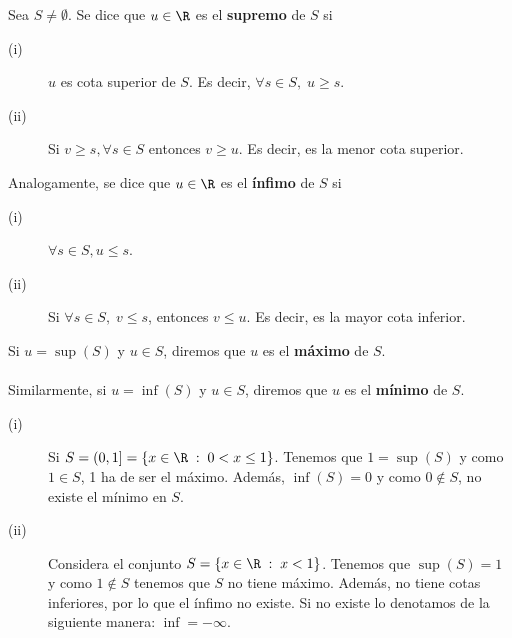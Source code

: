 \begin{fdefinition}[]
\normalfont Sea $\displaystyle S \neq \emptyset $. Se dice que $\displaystyle u \in \R $ es el \textbf{supremo} de $\displaystyle S $ si 
\begin{description}
\item[(i)] $\displaystyle u $ es cota superior de $\displaystyle S $. Es decir, $\displaystyle \forall s \in S, \; u \geq s $. 
\item[(ii)] Si $\displaystyle v \geq s, \forall s \in S $ entonces $\displaystyle v \geq u $. Es decir, es la menor cota superior. 
\end{description}
Analogamente, se dice que $\displaystyle u \in \R $ es el \textbf{ínfimo} de $\displaystyle S $ si
\begin{description}
\item[(i)] $\displaystyle \forall s \in S, u \leq s $.
\item[(ii)] Si $\displaystyle \forall s \in S, \; v \leq s $, entonces $\displaystyle v \leq u $. Es decir, es la mayor cota inferior.
\end{description}
\end{fdefinition}

\begin{fdefinition}[]
\normalfont Si $\displaystyle u = \sup\left(S\right) $ y $\displaystyle u \in S $, diremos que $\displaystyle u $ es el \textbf{máximo}  de $\displaystyle S $. \\ \\
Similarmente, si $\displaystyle u = \inf\left(S\right) $ y $\displaystyle u \in S $, diremos que $\displaystyle u $ es el \textbf{mínimo}  de $\displaystyle S $.
\end{fdefinition}

\begin{eg}
\normalfont 
\begin{description}
	\item[(i)] Si $\displaystyle S = (0,1] = \left\{ x \in \R \; : \; 0 < x \leq 1\right\} $. Tenemos que $\displaystyle 1 = \sup\left(S\right) $ y como $\displaystyle 1 \in S $, 1 ha de ser el máximo. Además, $\displaystyle \inf\left(S\right) = 0 $ y como $\displaystyle 0 \not\in S $, no existe el mínimo en $\displaystyle S $.
	\item[(ii)] Considera el conjunto $\displaystyle S = \left\{ x \in \R \; : \; x <1\right\}  $. Tenemos que $\displaystyle \sup\left(S\right) = 1 $ y como $\displaystyle 1 \not\in S $ tenemos que $\displaystyle S $ no tiene máximo. Además, no tiene cotas inferiores, por lo que el ínfimo no existe. Si no existe lo denotamos de la siguiente manera: $\displaystyle \inf = -\infty $.
\end{description}
\end{eg}


